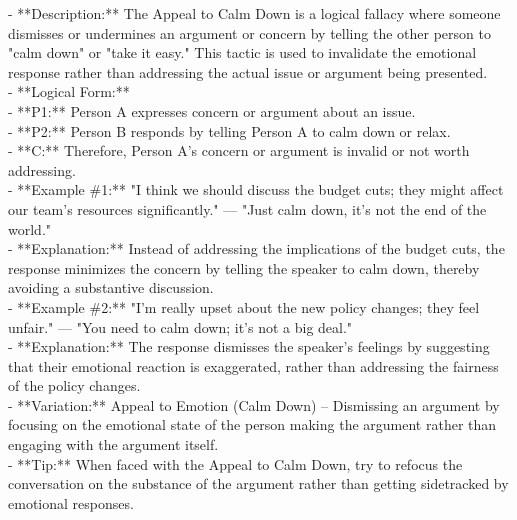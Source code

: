 \documentclass[a4paper,12pt,single,pdftex]{scrbook}
\begin{document}
  
    
      - **Description:** The Appeal to Calm Down is a logical fallacy where someone dismisses or undermines an argument or concern by telling the other person to "calm down" or "take it easy." This tactic is used to invalidate the emotional response rather than addressing the actual issue or argument being presented.
    \\

    
      - **Logical Form:**
    \\

    
        - **P1:** Person A expresses concern or argument about an issue.
    \\

    
        - **P2:** Person B responds by telling Person A to calm down or relax.
    \\

    
        - **C:** Therefore, Person A's concern or argument is invalid or not worth addressing.
    \\

    
      - **Example \#1:** "I think we should discuss the budget cuts; they might affect our team's resources significantly." — "Just calm down, it's not the end of the world."
    \\

    
      - **Explanation:** Instead of addressing the implications of the budget cuts, the response minimizes the concern by telling the speaker to calm down, thereby avoiding a substantive discussion.
    \\

    
      - **Example \#2:** "I'm really upset about the new policy changes; they feel unfair." — "You need to calm down; it's not a big deal."
    \\

    
      - **Explanation:** The response dismisses the speaker's feelings by suggesting that their emotional reaction is exaggerated, rather than addressing the fairness of the policy changes.
    \\

    
      - **Variation:** Appeal to Emotion (Calm Down) – Dismissing an argument by focusing on the emotional state of the person making the argument rather than engaging with the argument itself.
    \\

    
      - **Tip:** When faced with the Appeal to Calm Down, try to refocus the conversation on the substance of the argument rather than getting sidetracked by emotional responses.
    \\
\end{document}
